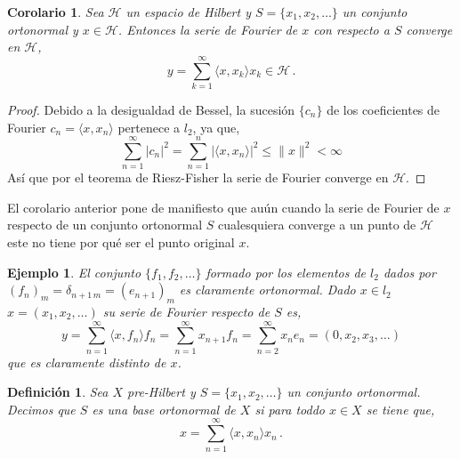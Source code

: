 \documentclass[12pt]{book}
\newtheorem{defn}{\bf Definición}[chapter]
\newtheorem{ejemplo}{\bf Ejemplo}[chapter]
\newtheorem{coro}{Corolario}[chapter]
\newcommand{\abs}[1]{\lvert #1\rvert }
\newcommand{\norm}[1]{\lVert #1\rVert }
\newcommand{\lin}[1]{\langle #1 \rangle}
\begin{document}
\begin{coro} Sea $\mathcal{H}$ un espacio de Hilbert y $S=\{x_1,x_2,\dots\}$  un conjunto ortonormal y $x\in \mathcal{H}$. Entonces la serie de Fourier de $x$ con respecto a $S$ converge en $\mathcal{H}$, 
$$y=\sum_{k=1}^\infty \lin{x,x_k}x_k\in \mathcal{H}\,.$$
\end{coro}
\begin{proof}
Debido a la desigualdad de Bessel, la sucesión $\{c_n\}$ de los coeficientes de Fourier $c_n=\lin{x,x_n}$ pertenece a $l_2$, ya que,
$$\sum_{n=1}^\infty \abs{c_n}^2=\sum_{n=1}^n \abs{\lin{x,x_n}}^2\leq \norm{x}^2<\infty$$
Así que por el teorema de Riesz-Fisher  la serie de Fourier converge en $\mathcal{H}$.
\end{proof}
El corolario anterior pone de manifiesto que auún cuando la serie de Fourier de $x$  respecto de un conjunto ortonormal $S$ cualesquiera converge a un punto de $\mathcal{H}$ este no tiene por qué ser el punto original $x$.
\begin{ejemplo} El conjunto $\{f_1,f_2,\dots\}$ formado por los elementos de $l_2$ dados por $(f_n)_m=\delta_{n+1\,m}=(e_{n+1})_m$ es claramente ortonormal. Dado $x\in l_2$ $x=(x_1,x_2,\dots)$  su serie de Fourier respecto de $S$ es,
$$y=\sum_{n=1}^\infty \lin{x,f_n}  f_n=\sum_{n=1}^\infty  x_{n+1} f_n=\sum_{n=2}^\infty x_n e_n=(0,x_2,x_3,\dots)$$
que es claramente distinto de $x$.
\end{ejemplo}
\begin{defn} Sea $X$ pre-Hilbert y $S=\{x_1,x_2,\dots\}$  un conjunto ortonormal. Decimos que $S$ es una {\emph base ortonormal} de $X$  si para toddo $x\in X$ se tiene que,
$$x=\sum_{ n=1}^\infty \lin{x,x_n} x_n\,.$$
\end{defn}
\end{document}
